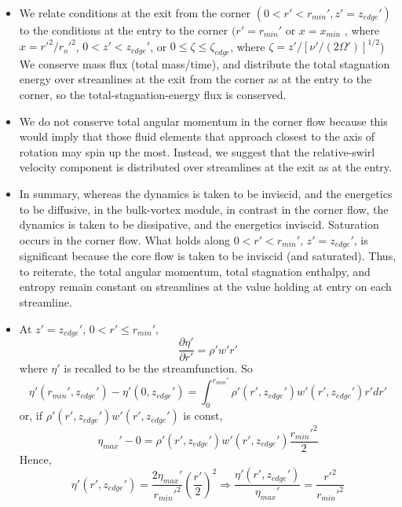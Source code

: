 \documentclass[preprint, prX]{revtex4}
\newcommand{\pfrac}[2]{\left(\frac{#1}{#2}\right)}
\newcommand{\pd}[2]{\frac{\partial#1}{\partial#2}}
\newcommand{\rmin}{r_{min}}
\newcommand{\xmin}{x_{min}}
\newcommand{\zedge}{z_{edge}}
\begin{document}
\begin{itemize}
\item
We relate conditions at the exit from the corner $(0<r'<\rmin', z'=\zedge')$ to the conditions at the entry to the corner $(r'=\rmin'$ or $x=\xmin$ , where $x=r'^2/r_o'^2$,  $0 < z' < \zedge'$, or $0\leq \zeta \leq \zeta_{edge}$, where $\zeta = z'/ [\nu'/(2\Omega')]^{1/2}$) We conserve mass flux (total mass/time), and distribute the total stagnation energy over streamlines at the exit from the corner as at the entry to the corner, so the total-stagnation-energy flux is conserved.

\item
We do not conserve total angular momentum in the corner flow because this would imply that those fluid elements that approach closest to the axis of rotation may spin up the most. Instead, we suggest that the relative-swirl velocity component is distributed over streamlines at the exit as at the entry.

\item
In summary, whereas the dynamics is taken to be inviscid, and the energetics to be diffusive, in the bulk-vortex module, in contrast in the corner flow, the dynamics is taken to be dissipative, and the energetics inviscid. Saturation occurs in the corner flow. What holds along $0 < r'<\rmin'$, $z'=\zedge'$, is significant because the core flow is taken to be inviscid (and saturated). Thus, to reiterate, the total angular momentum, total stagnation enthalpy, and entropy remain constant on streamlines at the value holding at entry on each streamline.

\item
At $z'=\zedge'$, $0<r'\leq \rmin'$,
\begin{equation}
\pd{\eta'}{r'} = \rho' w' r'
\end{equation}
where $\eta'$ is recalled to be the streamfunction. So
\begin{equation}
\eta'(\rmin',\zedge') - \eta'(0,\zedge') = \int_0^{\rmin'} \rho'(r',\zedge') w'(r',\zedge') r'dr'
\end{equation}
or, if $\rho'(r',\zedge')w'(r',\zedge')$ is const,
\begin{equation}
\eta_{max}' - 0 = \rho'(r',\zedge') w'(r',\zedge')\frac{\rmin'^2}{2}
\label{eq:corestreamconst}
\end{equation}
Hence,
\begin{equation}
\eta'(r',\zedge') = \frac{2 \eta_{max}'}{\rmin'^2}\pfrac{r'}{2}^2 \Rightarrow \frac{\eta'(r',\zedge')}{\eta_{max}'} = \frac{r'^2}{\rmin'^2}
\end{equation}


\end{itemize}
\end{document}
